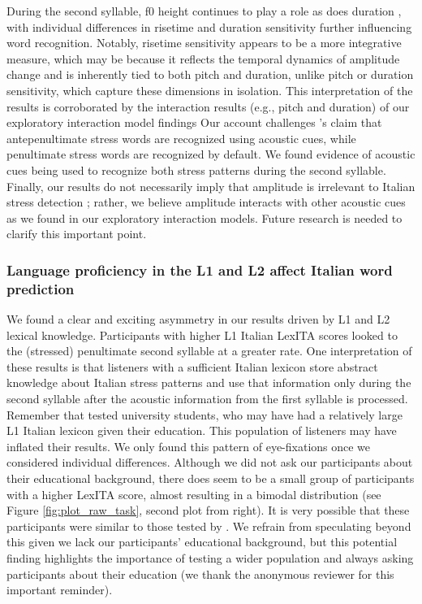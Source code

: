 During the second syllable, f0 height continues to play a role as does duration \citep[cf.][]{Alfano2006,Alfano2009}, with individual differences in risetime and duration sensitivity further influencing word recognition. Notably, risetime sensitivity appears to be a more integrative measure, which may be because it reflects the temporal dynamics of amplitude change and is inherently tied to both pitch and duration, unlike pitch or duration sensitivity, which capture these dimensions in isolation. This interpretation of the results is corroborated by the interaction results (e.g., pitch and duration) of our exploratory interaction model findings Our account challenges \cite{Sulpizio_McQueen_2012}'s claim that antepenultimate stress words are recognized using acoustic cues, while penultimate stress words are recognized by default. We found evidence of acoustic cues being used to recognize both stress patterns during the second syllable. Finally, our results do not necessarily imply that amplitude is irrelevant to Italian stress detection \citep[see][]{Maturi1998, Sulpizio_McQueen_2012}; rather, we believe amplitude interacts with other acoustic cues as we found in our exploratory interaction models. Future research is needed to clarify this important point.

\subsubsection{Language proficiency in the L1 and L2 affect Italian word prediction}

We found a clear and exciting asymmetry in our results driven by L1 and L2 lexical knowledge. Participants with higher L1 Italian LexITA scores looked to the (stressed) penultimate second syllable at a greater rate. One interpretation of these results is that listeners with a sufficient Italian lexicon store abstract knowledge about Italian stress patterns and use that information only during the second syllable after the acoustic information from the first syllable is processed. Remember that \cite{Sulpizio_McQueen_2012} tested university students, who may have had a relatively large L1 Italian lexicon given their education. This population of listeners may have inflated their results. We only found this pattern of eye-fixations once we considered individual differences. Although we did not ask our participants about their educational background, there does seem to be a small group of participants with a higher LexITA score, almost resulting in a bimodal distribution (see Figure \ref{fig:plot_raw_task}, second plot from right). It is very possible that these participants were similar to those tested by \cite{Sulpizio_McQueen_2012}. We refrain from speculating beyond this given we lack our participants' educational background, but this potential finding highlights the importance of testing a wider population and always asking participants about their education (we thank the anonymous reviewer for this important reminder).

